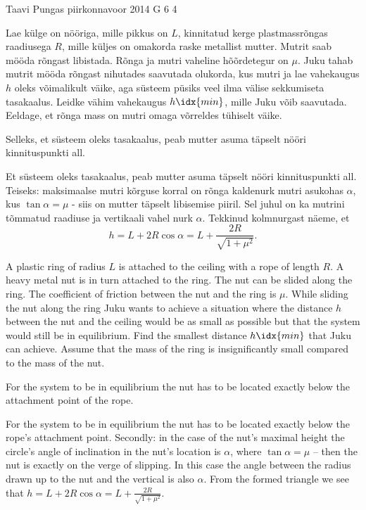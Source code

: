 {Taavi Pungas} %
{piirkonnavoor} %
{2014} %
{G 6} %
{4} %
{
\ifStatement
Lae külge on nööriga, mille pikkus on $L$, kinnitatud kerge plastmassrõngas raadiusega $R$, mille küljes on omakorda raske metallist mutter. Mutrit saab mööda rõngast libistada. Rõnga ja mutri vaheline hõõrdetegur on $\mu$. Juku tahab mutrit mööda rõngast nihutades saavutada olukorda, kus mutri ja lae vahekaugus $h$ oleks võimalikult väike, aga süsteem püsiks veel ilma välise sekkumiseta tasakaalus. Leidke vähim vahekaugus $h\idx{min}$, mille Juku võib saavutada. Eeldage, et rõnga mass on mutri omaga võrreldes tühiselt väike.
\fi


\ifHint
Selleks, et süsteem oleks tasakaalus, peab mutter asuma täpselt nööri kinnituspunkti all.
\fi


\ifSolution
Et süsteem oleks tasakaalus, peab mutter asuma täpselt nööri kinnituspunkti all. Teiseks: maksimaalse mutri kõrguse korral on rõnga kaldenurk mutri asukohas $\alpha$, kus $\tan \alpha = \mu$ - siis on mutter täpselt libisemise piiril. Sel juhul on ka mutrini tõmmatud raadiuse ja vertikaali vahel nurk $\alpha$. Tekkinud kolmnurgast näeme, et
\[
h=L+2R\cos \alpha = L+ \frac{2R}{\sqrt{1+\mu^2}}.
\]
\fi


\ifEngStatement
A plastic ring of radius $L$ is attached to the ceiling with a rope of length $R$. A heavy metal nut is in turn attached to the ring. The nut can be slided along the ring. The coefficient of friction between the nut and the ring is $\mu$. While sliding the nut along the ring Juku wants to achieve a situation where the distance $h$ between the nut and the ceiling would be as small as possible but that the system would still be in equilibrium. Find the smallest distance $h\idx{min}$ that Juku can achieve. Assume that the mass of the ring is insignificantly small compared to the mass of the nut.
\fi


\ifEngHint
For the system to be in equilibrium the nut has to be located exactly below the attachment point of the rope.
\fi


\ifEngSolution
For the system to be in equilibrium the nut has to be located exactly below the rope’s attachment point. Secondly: in the case of the nut’s maximal height the circle’s angle of inclination in the nut’s location is $\alpha$, where $\tan \alpha = \mu$ – then the nut is exactly on the verge of slipping. In this case the angle between the radius drawn up to the nut and the vertical is also $\alpha$. From the formed triangle we see that $h=L+2R\cos \alpha = L+ \frac{2R}{\sqrt{1+\mu^2}}$.
\fi
}